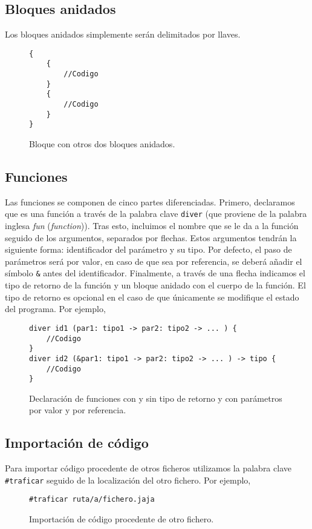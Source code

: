 \subsection*{Bloques anidados}
Los bloques anidados simplemente serán delimitados por llaves.
\begin{figure}[H]
    \centering
    \begin{lstlisting}
{
    {
        //Codigo
    }
    {
        //Codigo
    }
}
    \end{lstlisting}
    \caption{Bloque con otros dos bloques anidados.}
\end{figure}

\subsection*{Funciones}
Las funciones se componen de cinco partes diferenciadas. Primero, declaramos que
es una función a través de la palabra clave \lstinline{diver} (que proviene de la palabra
inglesa \textit{fun} (\textit{function})). Tras esto, incluimos el nombre que se
le da a la función seguido de los argumentos, separados por flechas. Estos
argumentos tendrán la siguiente forma: identificador del parámetro y su tipo.
Por defecto, el paso de parámetros será por valor, en caso de que sea por
referencia, se deberá añadir el símbolo \lstinline{&} antes del identificador.
Finalmente, a través de una flecha indicamos el tipo de retorno de la función y
un bloque anidado con el cuerpo de la función. El tipo de retorno es opcional en
el caso de que únicamente se modifique el estado del programa. Por ejemplo,
\begin{figure}[H]
    \centering
    \begin{lstlisting}
diver id1 (par1: tipo1 -> par2: tipo2 -> ... ) {
    //Codigo
}
diver id2 (&par1: tipo1 -> par2: tipo2 -> ... ) -> tipo {
    //Codigo
}
    \end{lstlisting}
    \caption{Declaración de funciones con y sin tipo de retorno y con parámetros
    por valor y por referencia.}
\end{figure}

\subsection*{Importación de código}
Para importar código procedente de otros ficheros utilizamos la palabra clave
\lstinline{#traficar} seguido de la localización del otro fichero. Por ejemplo,
\begin{figure}[H]
    \centering
    \begin{lstlisting}
#traficar ruta/a/fichero.jaja
    \end{lstlisting}
    \caption{Importación de código procedente de otro fichero.}
\end{figure}

